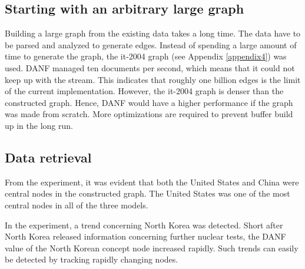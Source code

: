 \subsection{Starting with an arbitrary large graph}

Building a large graph from the existing data takes a long time. The data have to be parsed and analyzed to generate edges. Instead of spending a large amount of time to generate the graph, the it-2004 graph (see Appendix \ref{appendix4}) was used. DANF managed ten documents per second, which means that it could not keep up with the stream. This indicates that roughly one billion edges is the limit of the current implementation. However, the it-2004 graph is denser than the constructed graph. Hence, DANF would have a higher performance if the graph was made from scratch. More optimizations are required to prevent buffer build up in the long run. 

\subsection{Data retrieval}
From the experiment, it was evident that both the United States and China were central nodes in the constructed graph. The United States was one of the most central nodes in all of the three models.

In the experiment, a trend concerning North Korea was detected. Short after North Korea released information concerning further nuclear tests, the DANF value of the North Korean concept node increased rapidly. Such trends can easily be detected by tracking rapidly changing nodes.

